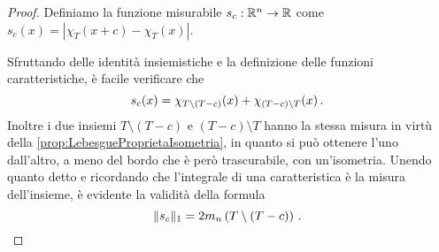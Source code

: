 \begin{proof}
	Definiamo la funzione misurabile $s_c:\mathbb R^n\to\mathbb R$ come $s_c(x)=\left\lvert\chi_T(x+c)-\chi_T(x)\right\rvert$.
	
	Sfruttando delle identità insiemistiche e la definizione delle funzioni caratteristiche, è facile verificare che
	\begin{equation*}
		s_c(x)=\chi_{T\setminus\left(T-c\right)}(x)+\chi_{\left(T-c\right)\setminus T}(x)\, \text{. }
	\end{equation*}
	Inoltre i due insiemi $T\setminus\left(T-c\right)$ e $\left(T-c\right)\setminus T$ hanno la stessa misura in virtù della \cref{prop:LebesgueProprietaIsometria}, in quanto si può ottenere l'uno dall'altro, a meno del bordo che è però trascurabile, con un'isometria.
	Unendo quanto detto e ricordando che l'integrale di una caratteristica è la misura dell'insieme, è evidente la validità della formula
	\begin{equation} \label{eq:IdentitaIntegraleContinuitaL1}
		\Vert s_c\Vert_1=2m_n\left(T\setminus\left(T-c\right)\right)\, \text{. }
	\end{equation}
	

\end{proof}
